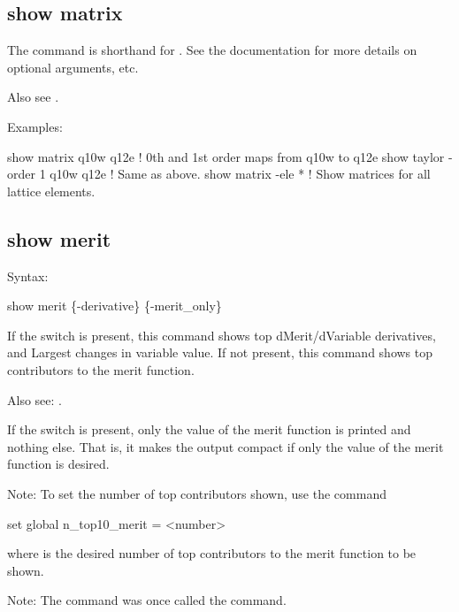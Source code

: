 {{{{{{{{{%

\subsection{show matrix}
\label{s:show.matrix}

The  command is shorthand for . See the  documentation for more details on optional arguments, etc.

Also see .

Examples:
\begin{example}
  show matrix q10w q12e           ! 0th and 1st order maps from q10w to q12e
  show taylor -order 1 q10w q12e  ! Same as above.
  show matrix -ele *              ! Show matrices for all lattice elements.
\end{example} 


\subsection{show merit}
\label{s:show.merit}

Syntax:
\begin{example}
  show merit \{-derivative\} \{-merit_only\}
\end{example}

If the  switch is present, this command shows top dMerit/dVariable derivatives, and
Largest changes in variable value. If not present, this command shows top contributors to the merit
function.

Also see: .

If the  switch is present, only the value of the merit function is printed and
nothing else. That is, it makes the output compact if only the value of the merit function is
desired.

Note: To set the number of top contributors shown, use the command 
\begin{example}
  set global n_top10_merit = <number>
\end{example}
where  is the desired number of top contributors to the merit function to be shown.

Note: The  command was once called the  command.

}}}}}}}}}
